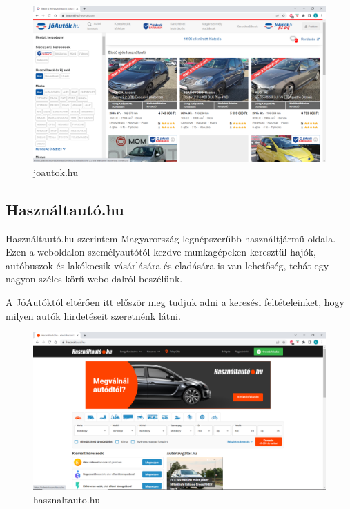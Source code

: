 \begin{figure}[h]
\centering
\includegraphics[scale=1]{images/joautok.png}
\caption{joautok.hu\cite{JoAuto}}
\label{fig:joautok}
\end{figure}

\subsection{Használtautó.hu}

Használtautó.hu szerintem Magyarország legnépszerűbb használtjármű oldala. Ezen a weboldalon személyautótól kezdve munkagépeken keresztül hajók, autóbuszok és lakókocsik vásárlására és eladására is van lehetőség, tehát egy nagyon széles körű weboldalról beszélünk.

A JóAutóktól eltérően itt először meg tudjuk adni a keresési feltételeinket, hogy milyen autók hirdetéseit szeretnénk látni.

\begin{figure}[h]
\centering
\includegraphics[scale=0.8]{images/hasznaltauto.png}
\caption{hasznaltauto.hu\cite{Hasznaltauto}}
\label{fig:hasznaltauto}
\end{figure}
\newpage

